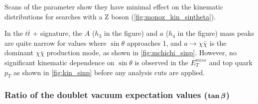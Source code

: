 

Scans of the \sinp parameter show they have minimal effect on the kinematic distributions for searches with a Z boson (\autoref{fig:monoz_kin_sintheta}). 

In the $t\bar{t}$ + \MET signature, the $A$ ($h_{3}$ in the figure) and $a$  ($h_{4}$ in the figure) mass peaks are quite narrow for values where $\sin\theta$ approaches 1, and $a\rightarrow\chi\bar{\chi}$ is the dominant $\chi\bar{\chi}$ production mode, as shown in \autoref{fig:mchichi_sinp}. 
However, no significant kinematic dependence on $\sin\theta$ is observed in the $E_{T}^{miss}$ and top quark $p_{T}$ as shown in \autoref{fig:kin_sinp} before any analysis cuts are applied.

\subsubsection[Ratio of the doublet vacuum expectation values ($\tanb$)]{Ratio of the doublet vacuum expectation values ($\boldsymbol{\tan\beta}$)}

